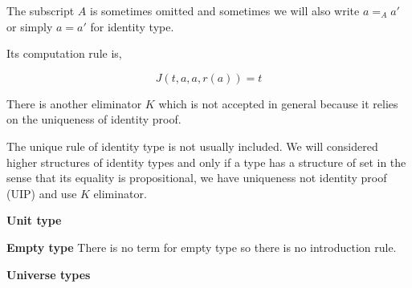 The subscript $A$ is sometimes omitted and sometimes we will also write $a =_{A} a'$ or simply $a = a'$ for identity type.


Its computation rule is,

$$J(t,a,a,r(a)) = t$$


There is another eliminator $K$ which is not accepted in general because it relies on the uniqueness of identity proof.



The unique rule of identity type is not usually included. We will considered higher structures of identity types and only if a type has a structure of set in the sense that its equality is propositional, we have uniqueness not identity proof (UIP) and use $K$ eliminator.

\textbf{Unit type}


\begin{multicols}{2}
\columnbreak
{}
\end{multicols}



\textbf{Empty type}
There is no term for empty type so there is no introduction rule.


\begin{multicols}{2}

\columnbreak


\end{multicols}

\textbf{Universe types}


\begin{multicols}{2}



\columnbreak


\end{multicols}

